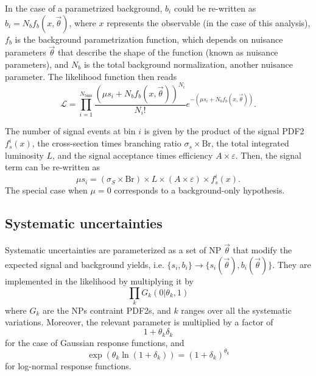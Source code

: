 In the case of a parametrized background, \(b_i\) could be re-written as \(b_i = N_b f_b\left(x, \vec{\theta}\right)\), where \(x\) represents the observable (\myj in the case of this analysis), \(f_b\) is the background parametrization function, which depends on nuisance parameters \(\vec{\theta}\) that describe the shape of the function (known as nuisance parameters), and \(N_b\) is the total background normalization, another nuisance parameter. The likelihood function then reads
\begin{equation}
    \label{eq:strategy:stat_treatment:stat_model:likelihood}
    \mathcal{L} = 
    \prod_{i=1}^{N_{\text{bins}}} \frac{\left( \mu s_i + N_b f_b \left(x, \vec{\theta}\right) \right)^{N_i}}{N_i !} e^{-\left( \mu s_i + N_b f_b \left(x, \vec{\theta}\right) \right)}.
\end{equation}

The number of signal events at bin \(i\) is given by the product of the signal \ac{PDF2} \(f_s^i(x)\), the cross-section times branching ratio \(\sigma_s \times \text{Br}\), the total integrated luminosity \(L\), and the signal acceptance times efficiency \(A \times \varepsilon\). Then, the signal term can be re-written as
\begin{equation}
    \label{eq:strategy:stat_treatment:stat_model:mu_si}
    \mu s_i = \left(\sigma_S \times \text{Br} \right) \times L \times \left(A \times \varepsilon\right) \times f_s^i(x).
\end{equation}
The special case when \(\mu = 0\) corresponds to a background-only hypothesis.



\subsection{Systematic uncertainties}
\label{subsec:strategy:stat_treatment:systs}

Systematic uncertainties are parameterized as a set of \ac{NP} \(\vec{\theta}\) that modify the expected signal and background yields, i.e. \(\{s_i, b_i\} \to \{s_i(\vec{\theta}), b_i(\vec{\theta})\}\). They are implemented in the likelihood by multiplying it by
\begin{equation}
    \prod_{k} G_k(0 | \theta_k, 1)
\end{equation}
where \(G_k\) are the \acp{NP} contraint \acp{PDF2}, and \(k\) ranges over all the systematic variations. Moreover, the relevant parameter is multiplied by a factor of
\begin{equation}
    1 + \theta_k \delta_k
\end{equation}
for the case of Gaussian response functions, and
\begin{equation}
    \exp\left( \theta_k \ln\left(1 + \delta_k\right) \right) = \left(1 + \delta_k\right)^{\theta_k}
\end{equation}
for log-normal response functions.

